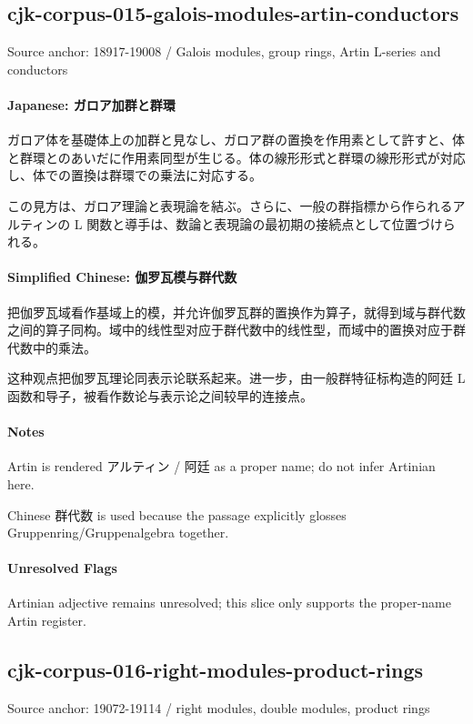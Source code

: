 \documentclass[11pt]{article}
\begin{document}
\subsection*{cjk-corpus-015-galois-modules-artin-conductors}
Source anchor: 18917-19008 / Galois modules, group rings, Artin L-series and conductors
\par
\paragraph{Japanese: ガロア加群と群環}
ガロア体を基礎体上の加群と見なし、ガロア群の置換を作用素として許すと、体と群環とのあいだに作用素同型が生じる。体の線形形式と群環の線形形式が対応し、体での置換は群環での乗法に対応する。\par
この見方は、ガロア理論と表現論を結ぶ。さらに、一般の群指標から作られるアルティンの L 関数と導手は、数論と表現論の最初期の接続点として位置づけられる。\par
\paragraph{Simplified Chinese: 伽罗瓦模与群代数}
把伽罗瓦域看作基域上的模，并允许伽罗瓦群的置换作为算子，就得到域与群代数之间的算子同构。域中的线性型对应于群代数中的线性型，而域中的置换对应于群代数中的乘法。\par
这种观点把伽罗瓦理论同表示论联系起来。进一步，由一般群特征标构造的阿廷 L 函数和导子，被看作数论与表示论之间较早的连接点。\par
\paragraph{Notes}
Artin is rendered アルティン / 阿廷 as a proper name; do not infer Artinian here.\par
Chinese 群代数 is used because the passage explicitly glosses Gruppenring/Gruppenalgebra together.\par
\paragraph{Unresolved Flags}
Artinian adjective remains unresolved; this slice only supports the proper-name Artin register.\par
\subsection*{cjk-corpus-016-right-modules-product-rings}
Source anchor: 19072-19114 / right modules, double modules, product rings
\par
\end{document}
